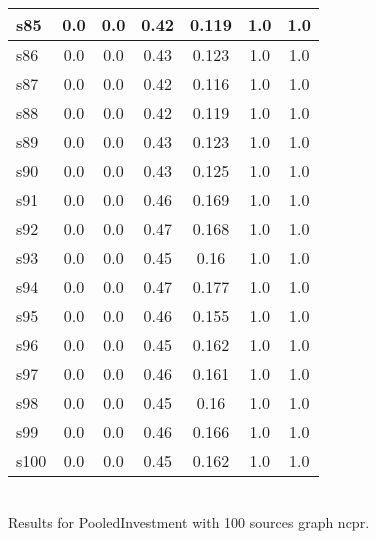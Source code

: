 \documentclass{article}
\begin{document}
\begin{tabular}{|l|c|c|c|c|c|c|}
\hline
s85 &0.0 & 0.0 & 0.42 & 0.119 & 1.0 & 1.0\\
\hline
s86 &0.0 & 0.0 & 0.43 & 0.123 & 1.0 & 1.0\\
\hline
s87 &0.0 & 0.0 & 0.42 & 0.116 & 1.0 & 1.0\\
\hline
s88 &0.0 & 0.0 & 0.42 & 0.119 & 1.0 & 1.0\\
\hline
s89 &0.0 & 0.0 & 0.43 & 0.123 & 1.0 & 1.0\\
\hline
s90 &0.0 & 0.0 & 0.43 & 0.125 & 1.0 & 1.0\\
\hline
s91 &0.0 & 0.0 & 0.46 & 0.169 & 1.0 & 1.0\\
\hline
s92 &0.0 & 0.0 & 0.47 & 0.168 & 1.0 & 1.0\\
\hline
s93 &0.0 & 0.0 & 0.45 & 0.16 & 1.0 & 1.0\\
\hline
s94 &0.0 & 0.0 & 0.47 & 0.177 & 1.0 & 1.0\\
\hline
s95 &0.0 & 0.0 & 0.46 & 0.155 & 1.0 & 1.0\\
\hline
s96 &0.0 & 0.0 & 0.45 & 0.162 & 1.0 & 1.0\\
\hline
s97 &0.0 & 0.0 & 0.46 & 0.161 & 1.0 & 1.0\\
\hline
s98 &0.0 & 0.0 & 0.45 & 0.16 & 1.0 & 1.0\\
\hline
s99 &0.0 & 0.0 & 0.46 & 0.166 & 1.0 & 1.0\\
\hline
s100 &0.0 & 0.0 & 0.45 & 0.162 & 1.0 & 1.0\\
\hline
\end{tabular}\\

\noindent Results for PooledInvestment with 100 sources graph ncpr.
\end{document}
